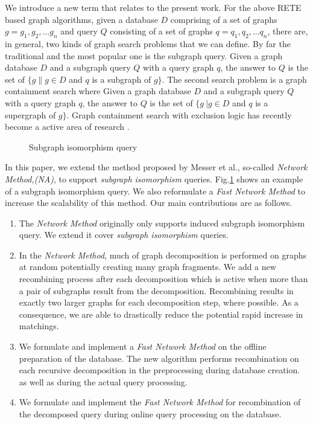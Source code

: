 We introduce a new term that relates to the present work. For the above RETE based graph algorithms, given a database $D$ comprising of a set of graphs $g=g_{1} ,g_{2} ,\ldots g_{n}$ and query $Q$ consisting of a set of graphs $q=q_{1} ,q_{2} ,\ldots q_{n}$, there are, in general, two kinds of graph search problems that we can define. By far the traditional and the most popular one is the subgraph query. Given a graph database $D$ and a subgraph query $Q$ with  a query graph $q$, the answer to $Q$ is the set of $\{g \| g\in D$ 
and $q$ is a subgraph of $g\} $. The second search problem is a graph containment search where Given a graph database $D$ and a subgraph query $Q$ with  
a query graph $q$, the answer to $Q$ is the set of $\{g\ | g\in D$ and $q$ is a supergraph of $g\}$. Graph containment search with exclusion logic has 
recently become a  active area of research \cite{chen2007_cindex} \cite{zhang_gao_wu2011}.  
 

\begin{figure}
\centering

\caption{Subgraph isomorphism query}
\label{fig:fig11}
\end{figure}


In this paper, we extend the method proposed by Messer et al.\cite{messmer_bunke2000}, so-called \textit{Network Method,(NA)}, to support \textit{subgraph isomorphism} queries.
Fig.\ref{fig:fig11} shows an example of a subgraph isomorphism query. We also reformulate a  \textit{Fast Network Method } to increase the scalability of this method.
Our main contributions are as follows.

\begin{enumerate}
\item The \textit{Network Method} originally only supports induced subgraph isomorphism query. We extend it  cover \textit{subgraph isomorphism} queries.
\item  In the \textit{Network Method}, much of graph decomposition is performed on graphs at random potentially creating many graph fragments. We add a new recombining 
process after each decomposition which is active when more than a pair of  subgraphs result from the decomposition.  Recombining results in exactly  two larger 
graphs for each decomposition step, where possible.  As a consequence, we are able to drastically reduce the potential rapid increase in matchings. 
\item We formulate and implement  a  \textit{Fast Network Method} on the offline preparation of the database. The new algorithm performs recombination 
on  each recursive decomposition in the  preprocessing during database creation. as well as during the actual query processing. 
\item We formulate and implement the \textit{Fast Network Method} for recombination of the decomposed query during  online query processing on the database.
\end{enumerate}

